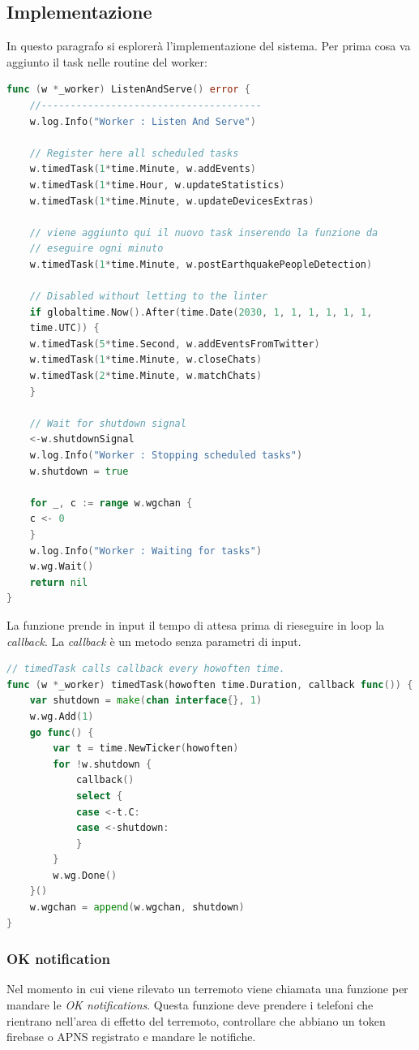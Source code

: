 \documentclass[main.tex]{subfiles}
\begin{document}
\subsection{Implementazione}
In questo paragrafo si esplorerà l'implementazione del sistema.\newline
Per prima cosa va aggiunto il task nelle routine del worker:
\begin{lstlisting}[language=go]
func (w *_worker) ListenAndServe() error {
    //--------------------------------------
    w.log.Info("Worker : Listen And Serve")
    
    // Register here all scheduled tasks
    w.timedTask(1*time.Minute, w.addEvents)
    w.timedTask(1*time.Hour, w.updateStatistics)
    w.timedTask(1*time.Minute, w.updateDevicesExtras)
    
    // viene aggiunto qui il nuovo task inserendo la funzione da
    // eseguire ogni minuto
    w.timedTask(1*time.Minute, w.postEarthquakePeopleDetection)
    
    // Disabled without letting to the linter
    if globaltime.Now().After(time.Date(2030, 1, 1, 1, 1, 1, 1, 
    time.UTC)) {
    w.timedTask(5*time.Second, w.addEventsFromTwitter)
    w.timedTask(1*time.Minute, w.closeChats)
    w.timedTask(2*time.Minute, w.matchChats)
    }
    
    // Wait for shutdown signal
    <-w.shutdownSignal
    w.log.Info("Worker : Stopping scheduled tasks")
    w.shutdown = true
    
    for _, c := range w.wgchan {
    c <- 0
    }
    w.log.Info("Worker : Waiting for tasks")
    w.wg.Wait()
    return nil
}
\end{lstlisting}
La funzione  prende in input il tempo di attesa prima di rieseguire in loop la \emph{callback}. La \emph{callback} è un metodo senza parametri di input.
\begin{lstlisting}[language=go]
// timedTask calls callback every howoften time.
func (w *_worker) timedTask(howoften time.Duration, callback func()) {
	var shutdown = make(chan interface{}, 1)
	w.wg.Add(1)
	go func() {
		var t = time.NewTicker(howoften)
		for !w.shutdown {
			callback()
			select {
			case <-t.C:
			case <-shutdown:
			}
		}
		w.wg.Done()
	}()
	w.wgchan = append(w.wgchan, shutdown)
}
\end{lstlisting}


\subsubsection{OK notification}
Nel momento in cui viene rilevato un terremoto viene chiamata una funzione per mandare le \emph{OK notifications}. Questa funzione deve prendere i telefoni che rientrano nell'area di effetto del terremoto, controllare che abbiano un token firebase o APNS registrato e mandare le notifiche.
\end{document}
